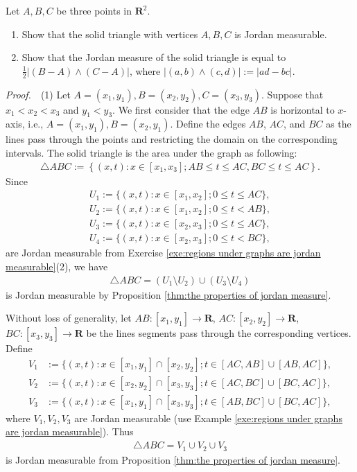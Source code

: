 \documentclass{book}
\theoremstyle{defstyle}
\theoremstyle{thmstyle}
\newcommand{\pff}{\noindent\emph{Proof.}~~}
\newcounter{Proposition}[section]
\begin{document}
\begin{example}
    Let $A, B, C$ be three points in $\mathbf{R}^2$.
    \begin{enumerate}[label = (\arabic*)]
        \item Show that the solid triangle with vertices $A, B, C$ is Jordan measurable.
        \item Show that the Jordan measure of the solid triangle is equal to $\frac{1}{2}|(B - A) \land (C - A)|$, where $|(a, b) \land (c, d)| := |ad - bc|$.
    \end{enumerate}
\end{example}

\pff (1) Let $A = (x_1, y_1), B = (x_2, y_2), C = (x_3, y_3)$. Suppose that $x_1 < x_2 < x_3$ and $y_1 < y_3$. We first consider that the edge $AB$ is horizontal to $x$-axis, i.e., $A = (x_1, y_1), B = (x_2, y_1)$. Define the edges $AB$, $AC$, and $BC$ as the lines pass through the points and restricting the domain on the corresponding intervals.
The solid triangle is the area under the graph as following:
    \begin{align*}
        \triangle ABC := \left\{(x, t) : x \in [x_1, x_3]; AB \leq t \leq AC, BC \leq t \leq AC \right\}.
    \end{align*}
Since
    \begin{align*}
        U_1 := \{(x, t) : x \in [x_1, x_2]; 0 \leq t \leq AC\},\\
        U_2 := \{(x, t) : x \in [x_1, x_2]; 0 \leq t < AB\},\\
        U_3 := \{(x, t) : x \in [x_2, x_3]; 0 \leq t \leq AC\},\\
        U_4 := \{(x, t) : x \in [x_2, x_3]; 0 \leq t < BC\},
    \end{align*}
are Jordan measurable from Exercise \ref{exe:regions under graphs are jordan measurable}(2), we have
    \begin{align*}
        \triangle ABC = (U_1 \setminus U_2) \cup (U_3 \setminus U_4)
    \end{align*}
is Jordan measurable by Proposition \ref{thm:the properties of jordan measure}.

Without loss of generality, let $AB : [x_1, y_1] \to \mathbf{R}$, $AC : [x_2, y_2] \to \mathbf{R}$, $BC : [x_3, y_3] \to \mathbf{R}$ be the lines segments pass through the corresponding vertices. Define
    \begin{align*}
        V_1 &:= \{(x, t) : x \in [x_1, y_1] \cap [x_2, y_2]; t \in [AC, AB] \cup [AB, AC]\},\\
        V_2 &:= \{(x, t) : x \in [x_2, y_2] \cap [x_3, y_3]; t \in [AC, BC] \cup [BC, AC]\},\\
        V_3 &:= \{(x, t) : x \in [x_1, y_1] \cap [x_3, y_3]; t \in [AB, BC] \cup [BC, AC]\},
    \end{align*}
where $V_1, V_2, V_3$ are Jordan measurable (use Example \ref{exe:regions under graphs are jordan measurable}). Thus 
    \begin{align*}
        \triangle ABC = V_1 \cup V_2 \cup V_3
    \end{align*}
is Jordan measurable from Proposition \ref{thm:the properties of jordan measure}.
\end{document}
